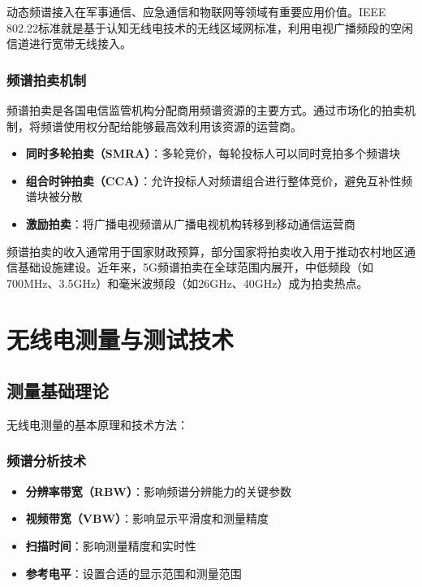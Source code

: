 \documentclass[12pt,UTF8]{ctexbook}
\begin{document}
动态频谱接入在军事通信、应急通信和物联网等领域有重要应用价值。IEEE 802.22标准就是基于认知无线电技术的无线区域网标准，利用电视广播频段的空闲信道进行宽带无线接入。

\subsection{频谱拍卖机制}

频谱拍卖是各国电信监管机构分配商用频谱资源的主要方式。通过市场化的拍卖机制，将频谱使用权分配给能够最高效利用该资源的运营商。

\begin{itemize}[leftmargin=3.5em]
    \item \textbf{同时多轮拍卖（SMRA）}：多轮竞价，每轮投标人可以同时竞拍多个频谱块
    \item \textbf{组合时钟拍卖（CCA）}：允许投标人对频谱组合进行整体竞价，避免互补性频谱块被分散
    \item \textbf{激励拍卖}：将广播电视频谱从广播电视机构转移到移动通信运营商
\end{itemize}

频谱拍卖的收入通常用于国家财政预算，部分国家将拍卖收入用于推动农村地区通信基础设施建设。近年来，5G频谱拍卖在全球范围内展开，中低频段（如700MHz、3.5GHz）和毫米波频段（如26GHz、40GHz）成为拍卖热点。

\chapter{无线电测量与测试技术}

\section{测量基础理论}

无线电测量的基本原理和技术方法：

\subsection{频谱分析技术}

\begin{itemize}[leftmargin=3.5em]
    \item \textbf{分辨率带宽（RBW）}：影响频谱分辨能力的关键参数
    \item \textbf{视频带宽（VBW）}：影响显示平滑度和测量精度
    \item \textbf{扫描时间}：影响测量精度和实时性
    \item \textbf{参考电平}：设置合适的显示范围和测量范围
\end{itemize}
\end{document}

